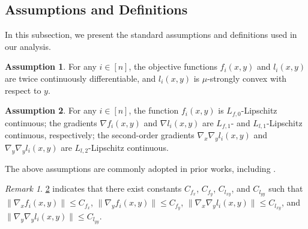 \documentclass{article}
\theoremstyle{plain}
\theoremstyle{definition}
\newtheorem{assumption}[assumption]{Assumption}
\theoremstyle{remark}
\newtheorem{remark}[remark]{Remark}
\begin{document}
\subsection{Assumptions and Definitions}\label{sec3.2}

In this subsection, we present the standard assumptions and definitions used in our analysis.

\begin{assumption}
For any $i\in[n]$, the objective functions $f_i(x, y)$ and $l_i(x, y)$ are twice continuously differentiable, and $l_i(x, y)$ is $\mu$-strongly 
convex with respect to $y$.\label{Assumption1}
\end{assumption}

\begin{assumption}
For any $i\in[n]$, the function $f_i(x, y)$ is $L_{f,0}$-Lipschitz continuous; the gradients $\nabla f_i(x, y)$ and 
$\nabla l_i(x, y)$ are $L_{f,1}$- and $L_{l,1}$-Lipschitz continuous, respectively; the second-order gradients 
$\nabla_x \nabla_y l_i(x, y)$ and $\nabla_y\nabla_y l_i(x, y)$ are $L_{l,2}$-Lipschitz continuous.\label{Assumption2}
\end{assumption}
\vspace{-0.19cm}

The above assumptions are commonly adopted in prior works, including \citep{zhu2024sparkle, chen2024decentralized, chen2023decentralized,dong2023single, ji2022will}.

\begin{remark}
    \cref{Assumption2} indicates that there exist constants $C_{f_x}$, $C_{f_y}$,  $C_{l_{xy}}$, and $C_{l_{yy}}$ such that $\|\nabla_x f_i(x, y)\| \leq C_{f_x}$, $\|\nabla_y f_i(x, y)\| \leq C_{f_y}$, $\|\nabla_x \nabla_y l_i(x, y)\| \leq C_{l_{xy}}$, and $\|\nabla_y \nabla_y l_i(x, y)\| \leq C_{l_{yy}}$.\label{remark1}
\end{remark}
\end{document}
